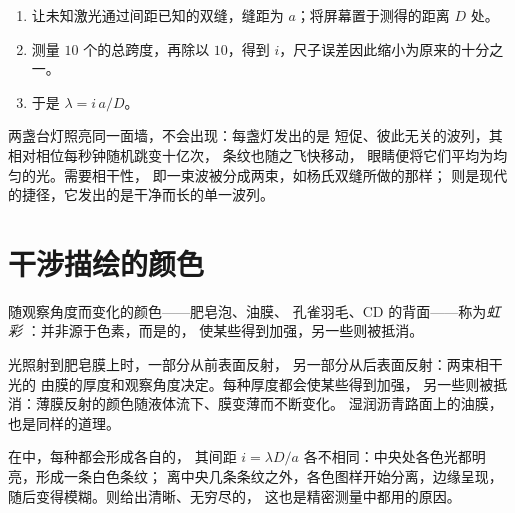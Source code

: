 \begin{method}[测量波长]\label{met:g12:light-as-wave:lambda}
\begin{enumerate}
  \item 让未知激光通过间距已知的双缝，缝距为
        $a$；将屏幕置于测得的距离 $D$ 处。
  \item 测量 $10$ 个的总跨度，再除以 $10$，得到
        $i$，尺子误差因此缩小为原来的十分之一。
  \item 于是 $\lambda = i\,a/D$。
\end{enumerate}
\end{method}

\begin{remark}[两盏台灯为何不产生干涉]\label{rem:g12:light-as-wave:lamps}
两盏台灯照亮同一面墙，不会出现：每盏灯发出的是
短促、彼此无关的波列，其相对相位每秒钟随机跳变十亿次，
条纹也随之飞快移动，
眼睛便将它们平均为均匀的光。需要相干性，
即一束波被分成两束，如杨氏双缝所做的那样；
则是现代的捷径，它发出的是干净而长的单一波列。
\end{remark}

\section{干涉描绘的颜色}

\begin{definition}[虹彩]\label{def:g12:light-as-wave:iridescence}
随观察角度而变化的颜色——肥皂泡、油膜、
孔雀羽毛、CD 的背面——称为\emph{虹彩}%
：并非源于色素，而是的，
使某些得到加强，另一些则被抵消。
\end{definition}

\begin{example}[肥皂膜与油膜]\label{ex:g12:light-as-wave:soap}
光照射到肥皂膜上时，一部分从前表面反射，
另一部分从后表面反射：两束相干光的
由膜的厚度和观察角度决定。每种厚度都会使某些得到加强，
另一些则被抵消：薄膜反射的颜色随液体流下、膜变薄而不断变化。
湿润沥青路面上的油膜，
也是同样的道理。
\end{example}

\begin{remark}[单色光与白光]\label{rem:g12:light-as-wave:white}
在中，每种都会形成各自的，
其间距 $i = \lambda D/a$ 各不相同：中央处各色光都明亮，形成一条白色条纹；
离中央几条条纹之外，各色图样开始分离，边缘呈现，
随后变得模糊。则给出清晰、无穷尽的，
这也是精密测量中都用的原因。
\end{remark}

